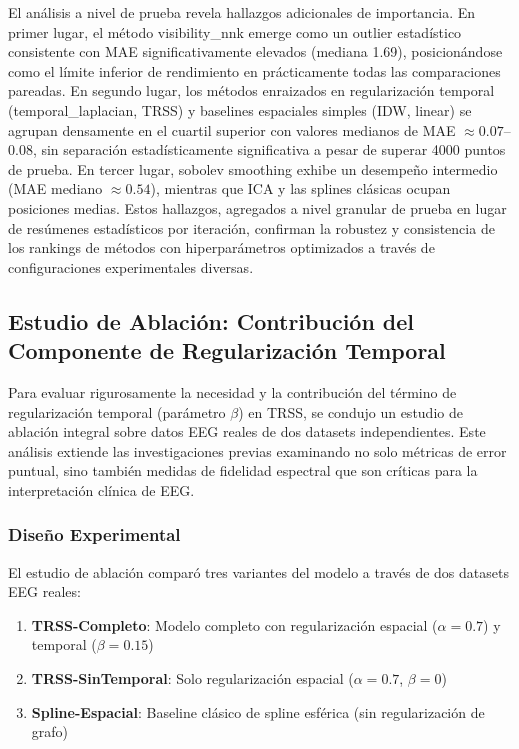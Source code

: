 El análisis a nivel de prueba revela hallazgos adicionales de importancia. En primer lugar, el método visibility\_nnk emerge como un outlier estadístico consistente con MAE significativamente elevados (mediana 1.69), posicionándose como el límite inferior de rendimiento en prácticamente todas las comparaciones pareadas. En segundo lugar, los métodos enraizados en regularización temporal (temporal\_laplacian, TRSS) y baselines espaciales simples (IDW, linear) se agrupan densamente en el cuartil superior con valores medianos de MAE $\approx 0.07$--$0.08$, sin separación estadísticamente significativa a pesar de superar 4000 puntos de prueba. En tercer lugar, sobolev smoothing exhibe un desempeño intermedio (MAE mediano $\approx 0.54$), mientras que ICA y las splines clásicas ocupan posiciones medias. Estos hallazgos, agregados a nivel granular de prueba en lugar de resúmenes estadísticos por iteración, confirman la robustez y consistencia de los rankings de métodos con hiperparámetros optimizados a través de configuraciones experimentales diversas.

\subsection{Estudio de Ablación: Contribución del Componente de Regularización Temporal}

Para evaluar rigurosamente la necesidad y la contribución del término de regularización temporal (parámetro $\beta$) en TRSS, se condujo un estudio de ablación integral sobre datos EEG reales de dos datasets independientes. Este análisis extiende las investigaciones previas examinando no solo métricas de error puntual, sino también medidas de fidelidad espectral que son críticas para la interpretación clínica de EEG.

\subsubsection{Diseño Experimental}

El estudio de ablación comparó tres variantes del modelo a través de dos datasets EEG reales:

\begin{enumerate}
  \item \textbf{TRSS-Completo}: Modelo completo con regularización espacial ($\alpha=0.7$) y temporal ($\beta=0.15$)
  \item \textbf{TRSS-SinTemporal}: Solo regularización espacial ($\alpha=0.7$, $\beta=0$)
  \item \textbf{Spline-Espacial}: Baseline clásico de spline esférica (sin regularización de grafo)
\end{enumerate}

